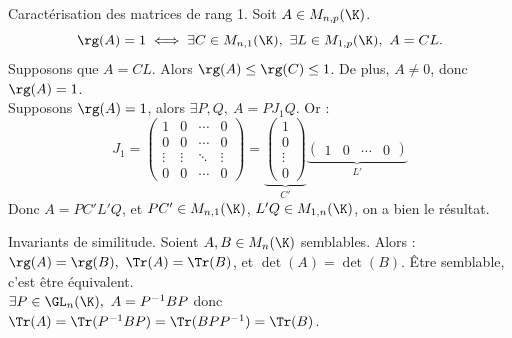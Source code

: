 \documentclass[11pt]{article}
\begin{document}
\pagebreak

\begin{prop}{Caractérisation des matrices de rang 1.}{}
    Soit $A\in M_{n,p}(\K)$.
    \begin{equation*}
        \rg(A)=1 \iff \exists C \in M_{n,1}(\K), ~ \exists L \in M_{1,p}(\K), ~ A=CL.
    \end{equation*}
    \tcblower
    \boxed{\la} Supposons que $A=CL$. Alors $\rg(A)\leq \rg(C)\leq 1$. De plus, $A\neq0$, donc $\rg(A)=1$.\\
    \boxed{\ra} Supposons $\rg(A)=1$, alors $\exists P,Q, ~ A = PJ_1Q$. Or :
    \begin{equation*}
        J_1=\begin{pmatrix}
            1 & 0 & \cdots & 0\\
            0 & 0 & \cdots & 0\\
            \vdots & \vdots & \ddots & \vdots\\
            0 & 0 & \cdots & 0
        \end{pmatrix} = \underbrace{\begin{pmatrix}
            1\\
            0\\
            \vdots\\
            0
        \end{pmatrix}}_{C'}\underbrace{\begin{pmatrix}
            1 & 0 & \cdots & 0
        \end{pmatrix}}_{L'}
    \end{equation*}
    Donc $A=PC'L'Q$, et $PC'\in M_{n,1}(\K)$, $L'Q\in M_{1,n}(\K)$, on a bien le résultat. 
\end{prop}

\vspace*{-0.7cm}

\begin{prop}{Invariants de similitude.}{}
    Soient $A,B\in M_n(\K)$ semblables. Alors : $\rg(A)=\rg(B), ~ \Tr(A)=\Tr(B)$, et $\det(A)=\det(B)$.
    \tcblower
     Être semblable, c'est être équivalent.\\
     $\exists P \in \GL_n(\K), ~ A=P^{-1}BP$ donc $\Tr(A)=\Tr(P^{-1}BP)=\Tr(BPP^{-1})=\Tr(B)$.
\end{prop}

\vspace*{-0.7cm}
\end{document}
